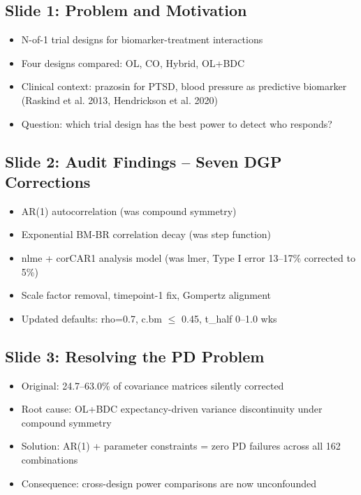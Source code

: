 \documentclass[11pt]{article}
\begin{document}
\subsection{Slide 1: Problem and Motivation}

\begin{itemize}
  \item N-of-1 trial designs for biomarker-treatment interactions
  \item Four designs compared: OL, CO, Hybrid, OL+BDC
  \item Clinical context: prazosin for PTSD, blood pressure as
    predictive biomarker (Raskind et al. 2013, Hendrickson et al.
    2020)
  \item Question: which trial design has the best power to detect
    who responds?
\end{itemize}

\subsection{Slide 2: Audit Findings -- Seven DGP Corrections}

\begin{itemize}
  \item AR(1) autocorrelation (was compound symmetry)
  \item Exponential BM-BR correlation decay (was step function)
  \item nlme + corCAR1 analysis model (was lmer, Type I error
    13--17\% corrected to 5\%)
  \item Scale factor removal, timepoint-1 fix, Gompertz alignment
  \item Updated defaults: rho=0.7, c.bm $\leq$ 0.45, t\_half 0--1.0 wks
\end{itemize}

\subsection{Slide 3: Resolving the PD Problem}

\begin{itemize}
  \item Original: 24.7--63.0\% of covariance matrices silently corrected
  \item Root cause: OL+BDC expectancy-driven variance discontinuity
    under compound symmetry
  \item Solution: AR(1) + parameter constraints = zero PD failures
    across all 162 combinations
  \item Consequence: cross-design power comparisons are now
    unconfounded
\end{itemize}
\end{document}
